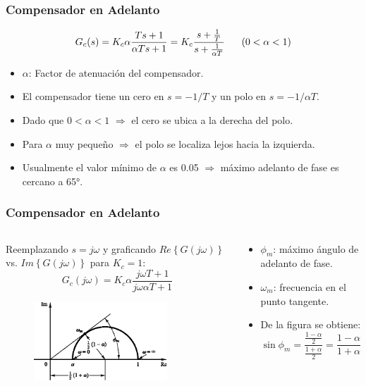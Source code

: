 \documentclass[aspectratio=169]{beamer}
\theoremstyle{definition}
\theoremstyle{plain}
\theoremstyle{remark}
\begin{document}
\begin{frame}[<+->]\frametitle{Compensador en Adelanto}
	\begin{equation*}
		G_c(s) = K_c \alpha \frac{T s + 1}{\alpha T s + 1} = K_c \frac{s+\frac{1}{T}}{s + \frac{1}{\alpha T}}\hspace*{6mm} (0 < \alpha < 1)
	\end{equation*}
	\pause
	\begin{itemize}
		\item $\alpha$: Factor de atenuación del compensador.
		\item El compensador tiene un cero en $s = -1/T$ y un polo en $s = -1/\alpha T$.
		\item Dado que $0 < \alpha < 1$ $\Rightarrow$ el cero se ubica a la derecha del polo.
		\item Para $\alpha$ muy pequeño $\Rightarrow$ el polo se localiza lejos hacia la izquierda.
		\item Usualmente el valor mínimo de $\alpha$ es 0.05 $\Rightarrow$ máximo adelanto de fase es cercano a \ang{65}. 
	\end{itemize}
\end{frame}

\begin{frame}[<+->]\frametitle{Compensador en Adelanto}
\vspace*{3mm}
\begin{columns}
	\begin{column}{0.5\textwidth}
		Reemplazando $s=j\omega$ y graficando $Re\left\{G(j\omega)\right\}$ vs. $Im\left\{G(j\omega)\right\}$ para $K_c=1$:
		\begin{equation*}
			G_c(j\omega) = K_c \alpha \frac{j\omega T + 1}{j\omega \alpha T + 1}
		\end{equation*}
		\begin{figure}
			\centering 
			\includegraphics[width=5cm]{images/polarPlot.eps}
		\end{figure}
	\end{column}
	\begin{column}{0.5\textwidth}
		\begin{itemize}
			\item $\phi_m$: máximo ángulo de adelanto de fase.
			\item $\omega_m$: frecuencia en el punto tangente.
			\item De la figura se obtiene:
			\begin{equation*}
				\sin \phi_m = \frac{\frac{1-\alpha}{2}}{\frac{1+\alpha}{2}} = \frac{1-\alpha}{1+\alpha}
			\end{equation*}
		\end{itemize}
	\end{column}
\end{columns}
\end{frame}
\end{document}
